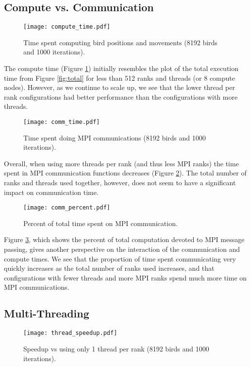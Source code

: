 \subsection*{Compute vs. Communication}

\begin{figure}[h!]
  \centering
  \texttt{[image: compute\_time.pdf]}
  \caption{Time spent computing bird positions and movements (8192
    birds and 1000 iterations).\label{fig:compute}}
\end{figure}

The compute time (Figure \ref{fig:compute}) initially resembles the
plot of the total execution time from Figure \ref{fig:total} for less
than 512 ranks and threads (or 8 compute nodes). However, as we
continue to scale up, we see that the lower thread per rank
configurations had better performance than the configurations with
more threads.

\begin{figure}[h!]
  \centering
  \texttt{[image: comm\_time.pdf]}
  \caption{Time spent doing MPI communications (8192 birds and 1000
    iterations).\label{fig:comm}}
\end{figure}

Overall, when using more threads per rank (and thus less MPI ranks)
the time spent in MPI communication functions decreases (Figure
\ref{fig:comm}). The total number of ranks and threads used together,
however, does not seem to have a significant impact on communication
time.

\begin{figure}[h!]
  \centering
  \texttt{[image: comm\_percent.pdf]}
  \caption{Percent of total time spent on MPI communication.\label{fig:commpercent}}
\end{figure}

Figure \ref{fig:commpercent}, which shows the percent of total
computation devoted to MPI message passing, gives another perspective
on the interaction of the communication and compute times. We see that
the proportion of time spent communicating very quickly increases as
the total number of ranks used increases, and that configurations with
fewer threads and more MPI ranks spend much more time on MPI
communications.

\subsection*{Multi-Threading}
\FloatBarrier
\begin{figure}[h!]
  \centering
  \texttt{[image: thread\_speedup.pdf]}
  \caption{Speedup vs using only 1 thread per rank (8192 birds and
    1000 iterations).\label{fig:threads}}
\end{figure}

